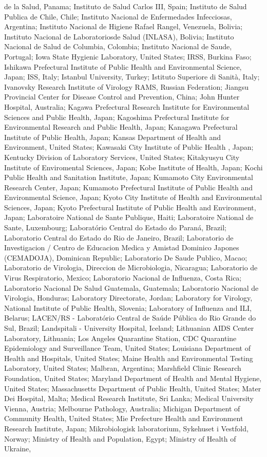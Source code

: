 \begin{appendixbox}
de la Salud, Panama; Instituto de Salud Carlos III, Spain; Instituto de Salud Publica de Chile, Chile; Instituto Nacional de Enfermedades Infecciosas, Argentina; Instituto Nacional de Higiene Rafael Rangel, Venezuela, Bolivia; Instituto Nacional de Laboratoriosde Salud (INLASA), Bolivia; Instituto Nacional de Salud de Columbia, Colombia; Instituto Nacional de Saude, Portugal; Iowa State Hygienic Laboratory, United States; IRSS, Burkina Faso; Ishikawa Prefectural Institute of Public Health and Environmental Science, Japan; ISS, Italy; Istanbul University, Turkey; Istituto Superiore di Sanità, Italy; Ivanovsky Research Institute of Virology RAMS, Russian Federation; Jiangsu Provincial Center for Disease Control and Prevention, China; John Hunter Hospital, Australia; Kagawa Prefectural Research Institute for Environmental Sciences and Public Health, Japan; Kagoshima Prefectural Institute for Environmental Research and Public Health, Japan; Kanagawa Prefectural Institute of Public Health, Japan; Kansas Department of Health and Environment, United States; Kawasaki City Institute of Public Health , Japan; Kentucky Division of Laboratory Services, United States; Kitakyusyu City Institute of Enviromental Sciences, Japan; Kobe Institute of Health, Japan; Kochi Public Health and Sanitation Institute, Japan; Kumamoto City Environmental Research Center, Japan; Kumamoto Prefectural Institute of Public Health and Environmental Science, Japan; Kyoto City Institute of Health and Environmental Sciences, Japan; Kyoto Prefectural Institute of Public Health and Environment, Japan; Laboratoire National de Sante Publique, Haiti; Laboratoire National de Sante, Luxembourg; Laboratório Central do Estado do Paraná, Brazil; Laboratorio Central do Estado do Rio de Janeiro, Brazil; Laboratorio de Investigacion / Centro de Educacion Medica y Amistad Dominico Japones (CEMADOJA), Dominican Republic; Laboratorio De Saude Publico, Macao; Laboratorio de Virologia, Direccion de Microbiologia, Nicaragua; Laboratorio de Virus Respiratorio, Mexico; Laboratorio Nacional de Influenza, Costa Rica; Laboratorio Nacional De Salud Guatemala, Guatemala; Laboratorio Nacional de Virologia, Honduras; Laboratory Directorate, Jordan; Laboratory for Virology, National Institute of Public Health, Slovenia; Laboratory of Influenza and ILI, Belarus; LACEN/RS - Laboratório Central de Saúde Pública do Rio Grande do Sul, Brazil; Landspitali - University Hospital, Iceland; Lithuanian AIDS Center Laboratory, Lithuania; Los Angeles Quarantine Station, CDC Quarantine Epidemiology and Surveillance Team, United States; Louisiana Department of Health and Hospitals, United States; Maine Health and Environmental Testing Laboratory, United States; Malbran, Argentina; Marshfield Clinic Research Foundation, United States; Maryland Department of Health and Mental Hygiene, United States; Massachusetts Department of Public Health, United States; Mater Dei Hospital, Malta; Medical Research Institute, Sri Lanka; Medical University Vienna, Austria; Melbourne Pathology, Australia; Michigan Department of Community Health, United States; Mie Prefecture Health and Environment Research Institute, Japan; Mikrobiologisk laboratorium, Sykehuset i Vestfold, Norway; Ministry of Health and Population, Egypt; Ministry of Health of Ukraine, 
\end{appendixbox}
